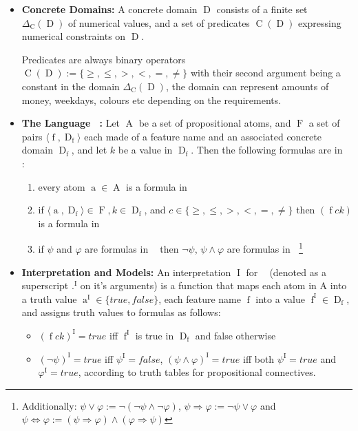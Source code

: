 \documentclass[12pt,msc,a4paper,oneside]{ucl_thesis}
\DeclareMathOperator{\Proplang}{\mathcal{L}(N)}
\DeclareMathOperator{\Propatom}{A}
\DeclareMathOperator{\propatom}{a}
\DeclareMathOperator{\Propvar}{F}
\DeclareMathOperator{\propvar}{f}
\DeclareMathOperator{\Propdom}{D}
\DeclareMathOperator{\Predicate}{C}
\DeclareMathOperator{\Interpretation}{I}
\begin{document}
\begin{itemize}
    \item
        \textbf{Concrete Domains:}\cite{Baader:1991:SIC:1631171.1631239} A concrete domain $\Propdom$ consists of a finite set $\Delta_{\Predicate}(\Propdom)$ of numerical values, and a set of predicates $\Predicate(\Propdom)$ expressing numerical constraints on $\Propdom$.

        Predicates are always binary operators $\Predicate(\Propdom) := \{\geq, \leq, >, <, =, \neq\}$ with their second argument being a constant in the domain $\Delta_{\Predicate}(\Propdom)$, the domain can represent amounts of money, weekdays, colours etc depending on the requirements\cite{Ragone2008}.

    \item
        \textbf{The Language $\Proplang$:}\cite{Ragone2008} Let $\Propatom$ be a set of propositional atoms, and $\Propvar$ a set of pairs $\langle\propvar, \Propdom_{\propvar}\rangle$ each made of a feature name and an associated concrete domain $\Propdom_{\propvar}$, and let $k$ be a value in $\Propdom_{\propvar}$. Then the following formulas are in $\Proplang$:
        \begin{enumerate}
            \item every atom $\propatom \in \Propatom$ is a formula in $\Proplang$
            \item if $\langle \propatom, \Propdom_{\propvar} \rangle \in \Propvar, k \in \Propdom_{\propvar}$, and $c \in \{\geq, \leq, >, <, =, \neq\}$ then $(\propvar ck)$ is a formula in $\Proplang$
            \item if $\psi$ and $\varphi$ are formulas in $\Proplang$ then $\neg\psi$, $\psi \wedge \varphi$ are formulas in $\Proplang$\footnote{Additionally: $\psi \vee \varphi := \neg(\neg\psi\wedge\neg\varphi)$, $\psi\Rightarrow\varphi := \neg\psi\vee\varphi$ and $\psi\Leftrightarrow\varphi := (\psi\Rightarrow\varphi)\wedge(\varphi\Rightarrow\psi)$}
        \end{enumerate}

    \item
        \textbf{Interpretation and Models:}\cite{Ragone2008} An interpretation $\Interpretation$ for $\Proplang$ (denoted as a superscript .$^{\Interpretation}$ on it's arguments) is a function that maps each atom in A into a truth value $\propatom^{\Interpretation} \in \{true, false\}$, each feature name $\propvar$ into a value $\propvar^{\Interpretation} \in \Propdom_{\propvar}$, and assigns truth values to formulas as follows:
        \begin{itemize}
            \item $(\propvar ck)^{\Interpretation} = true$ iff $\propvar^{\Interpretation}$ is true in $\Propdom_{\propvar}$ and false otherwise
            \item $(\neg\psi)^{\Interpretation} = true$ iff $\psi^{\Interpretation} = false$, $(\psi\wedge\varphi)^{\Interpretation} = true$ iff both $\psi^{\Interpretation} = true$ and $\varphi^{\Interpretation} = true$, according to truth tables for propositional connectives.
        \end{itemize}


\end{itemize}
\end{document}
